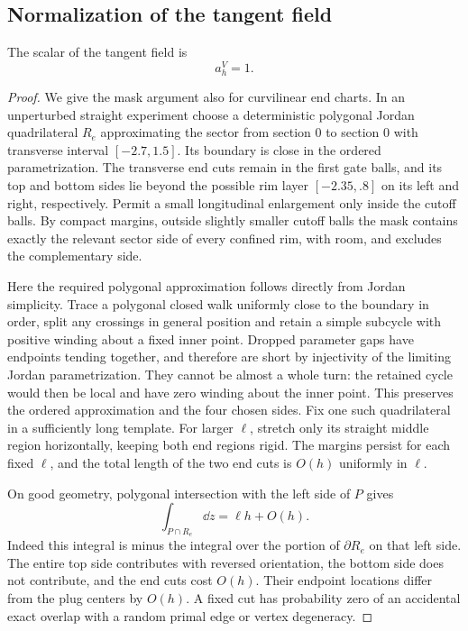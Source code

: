 \subsection{Normalization of the tangent field}

\begin{lemma}\label{lemma:tangent-normalization}
The scalar of the tangent field is
\begin{equation}\label{affine:tangent}
 a_h^V=1.
\end{equation}
\end{lemma}

\begin{proof}
We give the mask argument also for curvilinear end charts.  In an
unperturbed straight experiment choose a deterministic polygonal Jordan
quadrilateral $R_e$ approximating the sector from section $0$ to section
$0$ with transverse interval $[-2.7,1.5]$.  Its boundary is close in the
ordered parametrization.  The transverse end cuts remain in the first
gate balls, and its top and bottom sides lie beyond the possible rim
layer $[-2.35,.8]$ on its left and right, respectively.  Permit a small
longitudinal enlargement only inside the cutoff balls.  By compact
margins, outside slightly smaller cutoff balls the mask contains exactly
the relevant sector side of every confined rim, with room, and excludes
the complementary side.

Here the required polygonal approximation follows directly from Jordan
simplicity.  Trace a polygonal closed walk uniformly close to the
boundary in order, split any crossings in general position and retain
a simple subcycle with positive winding about a fixed inner point.
Dropped parameter gaps have endpoints tending together, and therefore
are short by injectivity of the limiting Jordan parametrization.  They
cannot be almost a whole turn: the retained cycle would then be local
and have zero winding about the inner point.  This preserves the ordered
approximation and the four chosen sides.  Fix one such quadrilateral in
a sufficiently long template.  For larger $\ell$, stretch only its
straight middle region horizontally, keeping both end regions rigid.
The margins persist for each fixed $\ell$, and the total length of the
two end cuts is $O(h)$ uniformly in $\ell$.

On good geometry, polygonal intersection with the left side of $P$
gives
\[
 \int_{P\cap R_e}\dd z=\ell h+O(h).
\]
Indeed this integral is minus the integral over the portion of
$\partial R_e$ on that left side.  The entire top side contributes with
reversed orientation, the bottom side does not contribute, and the end
cuts cost $O(h)$.  Their endpoint locations differ from the plug centers
by $O(h)$.  A fixed cut has probability zero of an accidental exact
overlap with a random primal edge or vertex degeneracy.


\end{proof}

